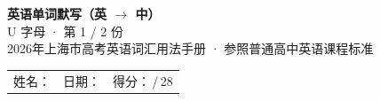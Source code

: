 \documentclass[10pt,a4paper]{article}
\begin{document}
\pagestyle{plain}

\begin{center}
{\LARGE\bfseries 英语单词默写（英 $\to$ 中）}\\[0.22em]
{\large U 字母 · 第 1 / 2 份}\\[0.18em]
{\small 2026年上海市高考英语词汇用法手册 · 参照普通高中英语课程标准}
\end{center}

\vspace{0.25em}
\noindent\begin{tabular}{@{}p{}@{}p{}@{}p{}@{}}
姓名：\underline{\hspace{2.0cm}} & 日期：\underline{\hspace{2.0cm}} & 得分：\underline{\hspace{1.3cm}}\,/\,28 \\
\end{tabular}

\vspace{0.3em}

\vspace{0.08em}
\end{document}

